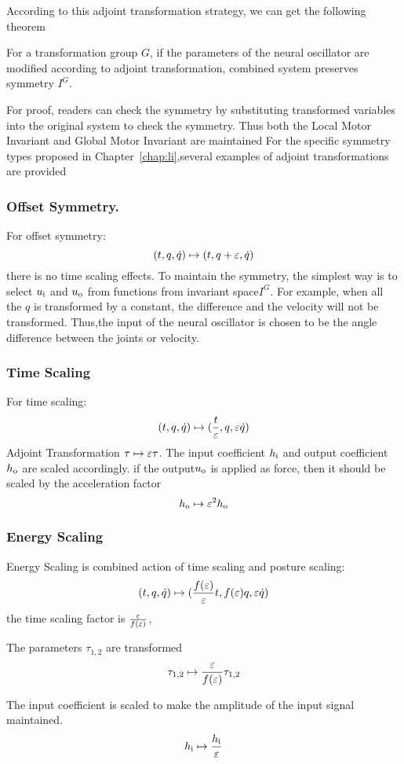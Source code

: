 According to this adjoint transformation strategy, we can get the following theorem
\begin{mythe}
For a transformation group $G$, if the parameters of the neural oscillator are modified according to adjoint transformation,
combined system preserves symmetry $I^G$.
\end{mythe}
For proof, readers can check the symmetry by substituting transformed variables into the original system to check the symmetry.
Thus both the Local Motor Invariant and Global Motor Invariant are maintained
For the specific symmetry types proposed in Chapter~\ref{chap:li},several examples of adjoint transformations are provided


\subsubsection*{ Offset Symmetry.}
For offset symmetry:
\[
(t,q,\dot{q}) \mapsto (t,q+\varepsilon,\dot{q})
\]
there is no time scaling effects.
To maintain the symmetry,  the simplest way is to select $u_{\mathrm{i}}$ and $u_{\mathrm{o}}$ from functions from invariant space$I^G$.
For example, when all the $q$ is transformed by a constant, the difference and the velocity will not be transformed. 
Thus,the input of the neural oscillator is chosen to be the angle difference between the joints or velocity.



\subsubsection*{Time Scaling}
For time scaling:
\[
(t,q,\dot{q}) \mapsto (\frac{t}{\varepsilon},q,\varepsilon \dot{q})
\]
Adjoint Transformation
$\tau \mapsto \varepsilon \tau $.
The input coefficient $h_{\mathrm{i}}$ and output coefficient $h_{\mathrm{o}}$ are scaled accordingly.
if the output$u_{\mathrm{o}}$ is applied as force, then it should be scaled by the acceleration factor
\[
 h_{\mathrm{o}} \mapsto \varepsilon^2 h_{\mathrm{o}}
\]
\subsubsection*{ Energy Scaling}
Energy Scaling is combined action of time scaling and posture scaling:
\[
(t,q,\dot{q} ) \mapsto ( \frac{f(\varepsilon)}{\varepsilon}t ,f(\varepsilon)q,\varepsilon\dot{q})
\]
the time scaling factor is $\frac{\varepsilon}{f(\varepsilon)}$, 

The parameters $\tau_{1,2}$ are transformed
\[
\tau_{1,2} \mapsto \frac{\varepsilon}{f(\varepsilon)} \tau_{1,2}
\]

The input coefficient is scaled to make the amplitude of the input signal maintained.
\[
h_{\mathrm{i}} \mapsto \frac{h_{\mathrm{i}}}{\varepsilon}
\]

